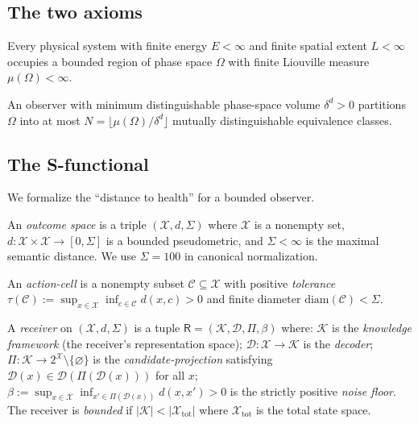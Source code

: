\documentclass[twocolumn,11pt,a4paper]{article}
\newcommand{\receiver}{\mathsf{R}}
\newcommand{\Cell}{\mathcal{C}}
\newcommand{\X}{\mathcal{X}}
\newcommand{\K}{\mathcal{K}}
\begin{document}
\subsection{The two axioms}

\begin{axiom}\label{ax:bps}
Every physical system with finite energy $E < \infty$ and finite spatial
extent $L < \infty$ occupies a bounded region of phase space $\Omega$ with
finite Liouville measure $\mu(\Omega) < \infty$.
\end{axiom}

\begin{axiom}\label{ax:cat}
An observer with minimum distinguishable phase-space volume
$\delta^d > 0$ partitions $\Omega$ into at most
$N = \lfloor\mu(\Omega)/\delta^d\rfloor$ mutually distinguishable
equivalence classes.
\end{axiom}

\subsection{The S-functional}

We formalize the ``distance to health'' for a bounded observer.

\begin{definition}\label{def:outcome}
An \emph{outcome space} is a triple $(\X, d, \Sigma)$ where $\X$ is a
nonempty set, $d:\X\times\X\to[0,\Sigma]$ is a bounded pseudometric, and
$\Sigma < \infty$ is the maximal semantic distance. We use $\Sigma = 100$
in canonical normalization.
\end{definition}

\begin{definition}\label{def:cell}
An \emph{action-cell} is a nonempty subset $\Cell \subseteq \X$ with
positive \emph{tolerance} $\tau(\Cell) := \sup_{x\in\X}\inf_{c\in\Cell}
d(x,c) > 0$ and finite diameter $\mathrm{diam}(\Cell) < \Sigma$.
\end{definition}

\begin{definition}\label{def:receiver}
A \emph{receiver} on $(\X,d,\Sigma)$ is a tuple
$\receiver = (\K, \mathcal{D}, \Pi, \beta)$ where:
$\K$ is the \emph{knowledge framework} (the receiver's representation space);
$\mathcal{D}:\X\to\K$ is the \emph{decoder};
$\Pi:\K\to 2^\X\setminus\{\varnothing\}$ is the \emph{candidate-projection}
satisfying $\mathcal{D}(x)\in\mathcal{D}(\Pi(\mathcal{D}(x)))$ for all $x$;
$\beta := \sup_{x\in\X}\inf_{x'\in\Pi(\mathcal{D}(x))}d(x,x') > 0$ is the
strictly positive \emph{noise floor}.
The receiver is \emph{bounded} if $|\K| < |\X_{\mathrm{tot}}|$ where
$\X_{\mathrm{tot}}$ is the total state space.
\end{definition}
\end{document}

